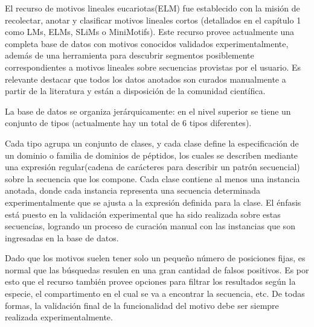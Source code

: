 El recurso de motivos lineales eucariotas(ELM) \cite{puntervoll2003elm,dinkel2013eukaryotic} fue establecido con la misión de recolectar, anotar y clasificar motivos lineales cortos
(detallados en el capítulo 1 como LMs, ELMs, SLiMs o MiniMotifs). 
Este recurso provee actualmente una completa base de datos con motivos conocidos validados experimentalmente, además de una herramienta 
para descubrir segmentos posiblemente correspondientes a motivos lineales sobre secuencias provistas por el usuario. 
Es relevante destacar que todos los datos anotados son curados manualmente a partir de la literatura y están a disposición de la comunidad científica.

La base de datos se organiza jerárquicamente: en el nivel superior se tiene un conjunto de tipos (actualmente hay un total de 6 tipos diferentes). 

Cada tipo agrupa un conjunto de clases, y cada clase define la especificación de un dominio o familia de dominios de péptidos, 
los cuales se describen mediante una expresión regular(cadena de carácteres para describir un patrón secuencial\cite{regex}) sobre la secuencia que los compone.
Cada clase contiene al menos una instancia anotada, donde cada instancia representa una secuencia determinada experimentalmente que se ajusta a la expresión definida para la clase.
El énfasis está puesto en la validación experimental que ha sido realizada sobre estas secuencias, logrando un proceso de curación manual con las instancias que son ingresadas en la base de datos.

Dado que los motivos suelen tener solo un pequeño número de posiciones fijas, es normal que las búsquedas resulen en una gran cantidad de falsos positivos.  
Es por esto que el recurso también provee opciones para filtrar los resultados según la especie, el compartimento en el cual se va a encontrar la secuencia, etc. 
De todas formas, la validación final de la funcionalidad del motivo debe ser siempre realizada experimentalmente.

